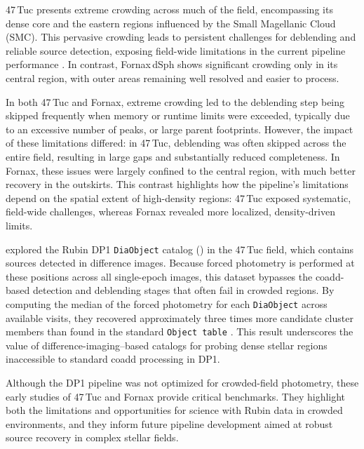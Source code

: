 47\,Tuc presents extreme crowding across much of the field, encompassing its dense core and the eastern regions influenced by the Small Magellanic Cloud (SMC). 
This pervasive crowding leads to persistent challenges for deblending and reliable source detection, exposing field-wide limitations in the current pipeline performance \citep{2025arXiv250701343C}.
In contrast, Fornax\,dSph shows significant crowding only in its central region, with outer areas remaining well resolved and easier to process. 

In both 47\,Tuc and Fornax, extreme crowding led to the deblending step being skipped frequently when memory or runtime limits were exceeded, typically due to an excessive number of peaks, or large parent footprints.
However, the impact of these limitations differed: in 47\,Tuc, deblending was often skipped across the entire field, resulting in large gaps and substantially reduced completeness. 
In Fornax, these issues were largely confined to the central region, with much better recovery in the outskirts. 
This contrast highlights how the pipeline’s limitations depend on the spatial extent of high-density regions: 47\,Tuc exposed systematic, field-wide challenges, whereas Fornax revealed more localized, density-driven limits.

\citet{2025RNAAS...9..171W} explored the Rubin \gls{DP1} \texttt{DiaObject} catalog () in the 47\,Tuc field, which contains sources detected in difference images. 
Because forced photometry is performed at these positions across all single-epoch images, this dataset bypasses the coadd-based detection and deblending stages that often fail in crowded regions. 
By computing the median of the forced photometry for each  \texttt{DiaObject} across available visits, they recovered approximately three times more candidate cluster members than found in the standard \texttt{Object table} \citep{2025arXiv250701343C}. 
This result underscores the value of difference-imaging–based catalogs for probing dense stellar regions inaccessible to standard coadd processing in \gls{DP1}.

Although the \gls{DP1} pipeline was not optimized for crowded-field photometry, these early studies of 47\,Tuc and Fornax provide critical benchmarks. 
They highlight both the limitations and opportunities for science with Rubin data in crowded environments, and they inform future pipeline development aimed at robust source recovery in complex stellar fields.
